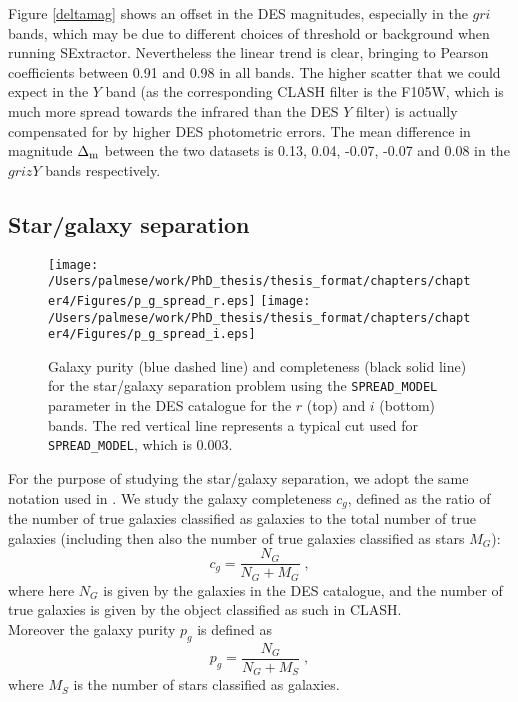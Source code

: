 {Figure \ref{deltamag} shows an offset in the DES magnitudes, especially in the $gri$ bands, which may be due to different choices of threshold or background when running SExtractor. Nevertheless the linear trend is clear, bringing to Pearson coefficients between 0.91 and 0.98 in all bands. The higher scatter that we could expect in the $Y$ band (as the corresponding CLASH filter is the F105W, which is much more spread towards the infrared than the DES $Y$ filter) is actually compensated for by higher DES photometric errors. The mean difference in magnitude $\Delta_{\rm m}$ between the two datasets is 0.13, 0.04, -0.07, -0.07 and 0.08 in the $grizY$ bands respectively.

\subsection{Star/galaxy separation}

\begin{figure}
\centering
\texttt{[image: /Users/palmese/work/PhD\_thesis/thesis\_format/chapters/chapter4/Figures/p\_g\_spread\_r.eps]}
\texttt{[image: /Users/palmese/work/PhD\_thesis/thesis\_format/chapters/chapter4/Figures/p\_g\_spread\_i.eps]}
\caption{Galaxy purity (blue dashed line) and completeness (black solid line) for the star/galaxy separation problem using the \texttt{SPREAD\_MODEL} parameter in the DES catalogue for the $r$ (top) and $i$ (bottom) bands. The red vertical line represents a typical cut used for \texttt{SPREAD\_MODEL}, which is  0.003.}\label{purity}
\end{figure}

For the purpose of studying the star/galaxy separation, we adopt the same notation used in \citet{soumagnac}. We study the galaxy completeness $c_g$, defined as the ratio of the number of true galaxies classified as galaxies to the total number of true galaxies (including then also the number of true galaxies classified as stars $M_G$):
\begin{equation}
c_g=\frac{N_G}{N_G+M_G}\;,
\end{equation}
where here $N_G$ is given by the galaxies in the DES catalogue, and the number of true galaxies is given by the object classified as such in CLASH.\\
Moreover the galaxy purity $p_g$ is defined as
\begin{equation}
p_g=\frac{N_G}{N_G+M_S}\;,
\end{equation}
where $M_S$ is the number of stars classified as galaxies.

}
